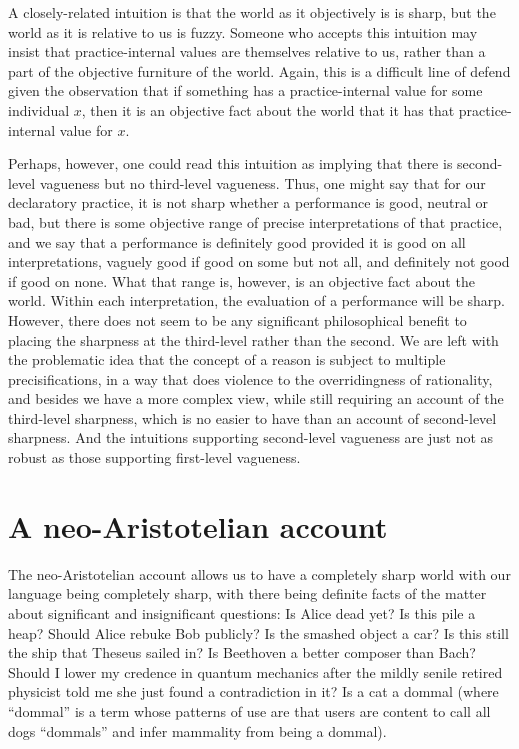 A closely-related intuition is that the world as it objectively is is sharp, but the world as it is relative to us is fuzzy.
Someone who accepts this intuition may insist that practice-internal values are themselves relative to us, rather than a part
of the objective furniture of the world. Again, this is a difficult line of defend given the observation that if something has
a practice-internal value for some individual $x$, then it is an objective fact about the world that it has that practice-internal 
value for $x$. 

Perhaps, however, one could read this intuition as implying that there is second-level vagueness but no third-level vagueness.
Thus, one might say that for our declaratory practice, it is not sharp whether a performance is good, neutral or bad, but 
there is some objective range of precise interpretations of that practice, and we say that a performance is definitely good 
provided it is good on all interpretations, vaguely good if good on some but not all, and definitely not good if good on none. 
What that range is, however, is an objective fact about the world. Within each interpretation, the evaluation of a performance 
will be sharp. However, there does not seem to be any significant philosophical benefit to placing the sharpness at the third-level
rather than the second. We are left with the problematic idea that the concept of a reason is subject to multiple precisifications, 
in a way that does violence to the overridingness of rationality, and besides we have a more complex view, while still requiring
an account of the third-level sharpness, which is no easier to have than an account of second-level sharpness. And the intuitions
supporting second-level vagueness are just not as robust as those supporting first-level vagueness.

\section{A neo-Aristotelian account}
The neo-Aristotelian account allows us to have a completely sharp world with our language being completely sharp, with there being
definite facts of the matter about significant and insignificant
questions: Is Alice dead yet? Is this pile a heap? Should Alice rebuke Bob publicly? Is the smashed object a car?
Is this still the ship that Theseus sailed in? Is Beethoven a better composer than Bach? Should I lower my credence in quantum
mechanics after the mildly senile retired physicist told me she just found a contradiction in it? Is a cat a dommal (where ``dommal''
is a term whose patterns of use are that users are content to call all dogs ``dommals'' and infer mammality from being
a dommal). 

